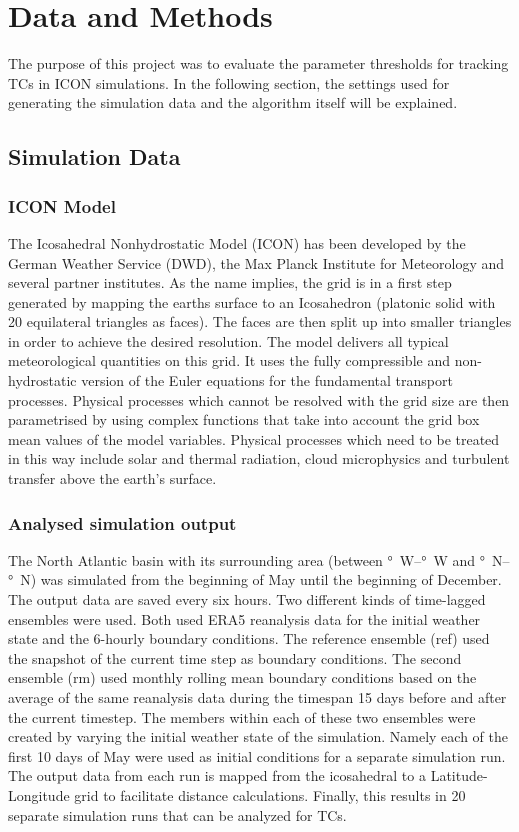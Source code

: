 \chapter{Data and Methods}
\label{sec:methods}
The purpose of this project was to evaluate the parameter thresholds for
tracking TCs in ICON simulations. In the following section, the settings
used for generating the simulation data and the algorithm itself will be
explained.
\section{Simulation Data}
\label{sec:data}
\subsection*{ICON Model}
The Icosahedral Nonhydrostatic Model (ICON) has been developed by the German Weather
Service (DWD), the Max Planck Institute for Meteorology and several partner
institutes\cite{icon-model}. As the name implies, the grid is in a first step generated by
mapping the earths surface to an Icosahedron (platonic solid with 20
equilateral triangles as faces). The faces are then split up into smaller
triangles in order to achieve the desired resolution. The model delivers
all typical meteorological quantities on this grid.
It uses the fully compressible and non-hydrostatic version of the Euler
equations for the fundamental transport processes. Physical processes which
cannot be resolved with the grid size are then parametrised by using complex
functions that take into account the grid box mean values of the model
variables. Physical processes which need to be treated in this way include
solar and thermal radiation, cloud microphysics and turbulent transfer above
the earth's surface\cite{dwd-icon}.

\subsection*{Analysed simulation output}
The North Atlantic basin with its surrounding area (between \unit[120]{\degree W}--\unit[15]{\degree W} and \unit[0]{\degree N}--\unit[70]{\degree N}) was simulated from the beginning of May until the beginning of December. The
output data are saved every six hours.
Two different kinds of time-lagged ensembles were used. Both used ERA5
reanalysis data for the initial weather state and the 6-hourly boundary
conditions. The reference ensemble (ref) used the snapshot of the current time step as boundary conditions. The second ensemble (rm) used
monthly rolling mean boundary conditions based on the average of the same reanalysis data during the timespan 15 days before and after the current timestep. 
The members within each of these two ensembles were created by varying the
initial weather state of the simulation. Namely each of the first 10 days of
May were used as initial conditions for a separate simulation run.
The output data from each run is mapped from the icosahedral to a
Latitude-Longitude grid to facilitate distance calculations.
Finally, this results in 20 separate simulation runs that can be analyzed for
TCs.

